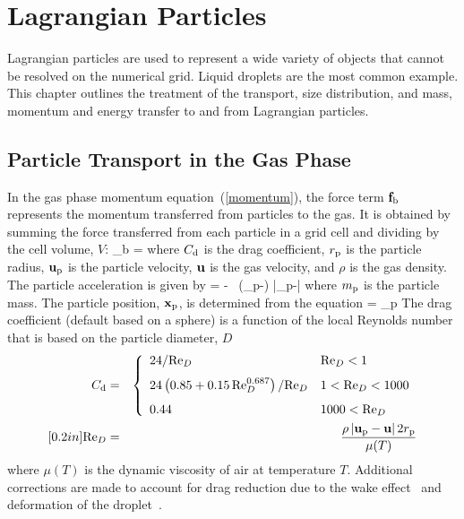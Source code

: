 
\chapter{Lagrangian Particles}
\label{chapter:lagrangian_particles}

Lagrangian particles are used to represent a wide variety of objects that cannot be resolved on
the numerical grid. Liquid droplets are the most common example. This chapter outlines the treatment of the transport, size
distribution, and mass, momentum and energy transfer to and from Lagrangian particles.

\section{Particle Transport in the Gas Phase}

In the gas phase momentum equation~(\ref{momentum}), the force term ${\bf f}_{\rm b}$ represents the momentum transferred from particles to the gas.
It is obtained by summing the force transferred from each particle
in a grid cell and dividing by the cell volume, $V$:
\be
    {\bof_{\rm b}} =  \sum {}
\ee
where $C_{\rm d}$ is the drag coefficient, $r_{\rm p}$ is the particle radius, ${\bf u}_{\rm p}$ is the particle velocity, ${\bf u}$ is the
gas velocity, and $\rho$ is the gas density. The particle acceleration is given by
\be
     = \bg - \ha {} \,
    (\bu_{\rm p}-\bu) |\bu_{\rm p}-\bu|
\ee
where $m_{\rm p}$ is the particle mass.  The particle position, ${\bf x}_{\rm p}$, is determined from the equation
\be
     = \bu_{\rm p}
\ee
The drag coefficient (default based on a sphere) is a function of the local Reynolds number that is based on the particle diameter, $D$
\begin{eqnarray}
 C_{\rm d} &=& \left\{ \begin{array}{ll}
     24/\hbox{Re}_D                                          & \hbox{Re}_D < 1    \\ [0.1in]
     24\left(0.85+0.15 \, \hbox{Re}_D^{0.687} \right)/\hbox{Re}_D  & 1 < \hbox{Re}_D < 1000 \\ [0.1in]
     0.44                                              & 1000 < \hbox{Re}_D
     \end{array} \right.  \\ [0.2in]
\hbox{Re}_D &=& \frac{\rho \, |{\bf u}_{\rm p}-{\bf u}| \, 2 r_{\rm p}}{\mu(T)} \end{eqnarray}
where $\mu(T)$ is the dynamic viscosity of air at temperature $T$. Additional corrections are made to account for drag reduction due to the wake effect~\cite{Ramirez:1} and deformation of the droplet~\cite{Loth:1}.


